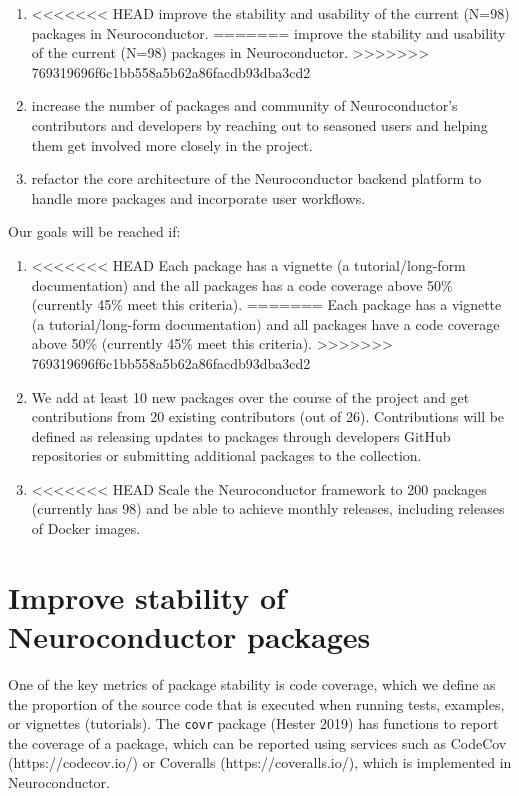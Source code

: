 \documentclass[]{elsarticle} %
\providecommand{\tightlist}{%
  \setlength{\itemsep}{0pt}\setlength{\parskip}{0pt}}
\begin{document}
\begin{enumerate}
\def\labelenumi{\arabic{enumi}.}
\tightlist
\item
<<<<<<< HEAD
  improve the stability and usability of the current (N=98) packages in Neuroconductor.
=======
  improve the stability and usability of the current (N=98) packages in
  Neuroconductor.
>>>>>>> 769319696f6c1bb558a5b62a86facdb93dba3cd2
\item
  increase the number of packages and community of Neuroconductor's
  contributors and developers by reaching out to seasoned users and
  helping them get involved more closely in the project.
\item
  refactor the core architecture of the Neuroconductor backend platform
  to handle more packages and incorporate user workflows.
\end{enumerate}

Our goals will be reached if:

\begin{enumerate}
\def\labelenumi{\arabic{enumi}.}
\tightlist
\item
<<<<<<< HEAD
  Each package has a vignette (a tutorial/long-form documentation) and the all packages has a code coverage above 50\% (currently 45\% meet this criteria).
=======
  Each package has a vignette (a tutorial/long-form documentation) and
  all packages have a code coverage above 50\% (currently 45\% meet this
  criteria).
>>>>>>> 769319696f6c1bb558a5b62a86facdb93dba3cd2
\item
  We add at least 10 new packages over the course of the project and get
  contributions from 20 existing contributors (out of 26). Contributions
  will be defined as releasing updates to packages through developers
  GitHub repositories or submitting additional packages to the
  collection.
\item
<<<<<<< HEAD
  Scale the Neuroconductor framework to 200 packages (currently has 98) and be able to achieve monthly releases, including releases of Docker images.
\end{enumerate}

\hypertarget{improve-stability-of-neuroconductor-packages}{%
\section{Improve stability of Neuroconductor packages}\label{improve-stability-of-neuroconductor-packages}}

One of the key metrics of package stability is code coverage, which we define as the proportion of the source code that is executed when running tests, examples, or vignettes (tutorials). The \texttt{covr} package (Hester 2019) has functions to report the coverage of a package, which can be reported using services such as CodeCov (https://codecov.io/) or Coveralls (https://coveralls.io/), which is implemented in Neuroconductor.
\end{document}
